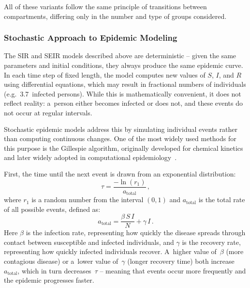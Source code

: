 \documentclass[english]{projectreport}
\begin{document}
\noindent
All of these variants follow the same principle of transitions between
compartments, differing only in the number and type of groups considered.

\subsubsection{Stochastic Approach to Epidemic Modeling}
\label{sec:stochastic}

The SIR and SEIR models described above are deterministic -- given the
same parameters and initial conditions, they always produce the same
epidemic curve. In each time step of fixed length, the model computes new
values of $S$, $I$, and $R$ using differential equations, which may
result in fractional numbers of individuals (e.g.\ 3.7~infected persons).
While this is mathematically convenient, it does not reflect reality:
a~person either becomes infected or does not, and these events do not
occur at regular intervals.

Stochastic epidemic models address this by simulating individual events
rather than computing continuous changes. One of the most widely used methods for this purpose is the Gillespie algorithm, originally developed for chemical kinetics~\cite{gillespie1977exact} and later widely adopted in computational epidemiology~\cite{allen2017primer}.

First, the time until the next event is drawn from an exponential
distribution:
\begin{equation}
  \tau = \frac{-\ln(r_1)}{a_{\text{total}}}\,,
  \label{eq:tau}
\end{equation}
where $r_1$ is a random number from the interval $(0,1)$ and
$a_{\text{total}}$ is the total rate of all possible events, defined as:
\begin{equation}
  a_{\text{total}} = \frac{\beta\, S\, I}{N} + \gamma\, I\,.
  \label{eq:a-total}
\end{equation}
Here $\beta$ is the infection rate, representing how quickly the disease
spreads through contact between susceptible and infected individuals,
and $\gamma$ is the recovery rate, representing how quickly infected
individuals recover. A~higher value of~$\beta$ (more contagious disease)
or a~lower value of~$\gamma$ (longer recovery time) both increase
$a_{\text{total}}$, which in turn decreases~$\tau$ -- meaning that
events occur more frequently and the epidemic progresses faster.
\end{document}
